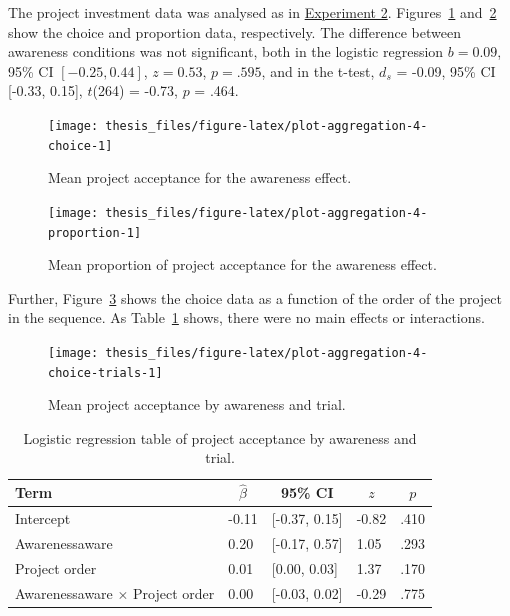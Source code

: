 \documentclass[a4paper, nobind, dvipsnames]{templates/ociamthesis}
\theoremstyle{definition}
\theoremstyle{definition}
\theoremstyle{definition}
\theoremstyle{definition}
\theoremstyle{remark}
\begin{document}
The project investment data was analysed as in
\protect\hyperlink{results-aggregation-2}{Experiment 2}.
Figures~\ref{fig:plot-aggregation-4-choice}
and~\ref{fig:plot-aggregation-4-proportion} show the choice and proportion
data, respectively. The difference between
awareness conditions was not significant, both in the logistic regression
\(b = 0.09\), 95\% CI \([-0.25, 0.44]\), \(z = 0.53\), \(p = .595\), and in the t-test,
\(d_s\) = -0.09, 95\% CI {[}-0.33, 0.15{]}, \(t\)(264) = -0.73, \(p\) = .464.



\begin{figure}
\texttt{[image: thesis\_files/figure-latex/plot-aggregation-4-choice-1]} \caption{Mean project acceptance for the awareness effect.}\label{fig:plot-aggregation-4-choice}
\end{figure}



\begin{figure}
\texttt{[image: thesis\_files/figure-latex/plot-aggregation-4-proportion-1]} \caption{Mean proportion of project acceptance for the awareness effect.}\label{fig:plot-aggregation-4-proportion}
\end{figure}

Further, Figure~\ref{fig:plot-aggregation-4-choice-trials} shows the choice
data as a function of the order of the project in the sequence. As
Table~\ref{tab:awareness-project-order} shows, there were no main effects or
interactions.



\begin{figure}
\texttt{[image: thesis\_files/figure-latex/plot-aggregation-4-choice-trials-1]} \caption{Mean project acceptance by awareness and trial.}\label{fig:plot-aggregation-4-choice-trials}
\end{figure}

\begin{table}[tbp]

\begin{center}
\begin{threeparttable}

\caption{\label{tab:awareness-project-order}Logistic regression table of project acceptance by awareness and trial.}

\begin{tabular}{lllll}
\toprule
Term & \multicolumn{1}{c}{$\hat{\beta}$} & \multicolumn{1}{c}{95\% CI} & \multicolumn{1}{c}{$z$} & \multicolumn{1}{c}{$p$}\\
\midrule
Intercept & -0.11 & {}[-0.37, 0.15] & -0.82 & .410\\
Awarenessaware & 0.20 & {}[-0.17, 0.57] & 1.05 & .293\\
Project order & 0.01 & {}[0.00, 0.03] & 1.37 & .170\\
Awarenessaware $\times$ Project order & 0.00 & {}[-0.03, 0.02] & -0.29 & .775\\
\bottomrule
\end{tabular}

\end{threeparttable}
\end{center}

\end{table}
\end{document}
